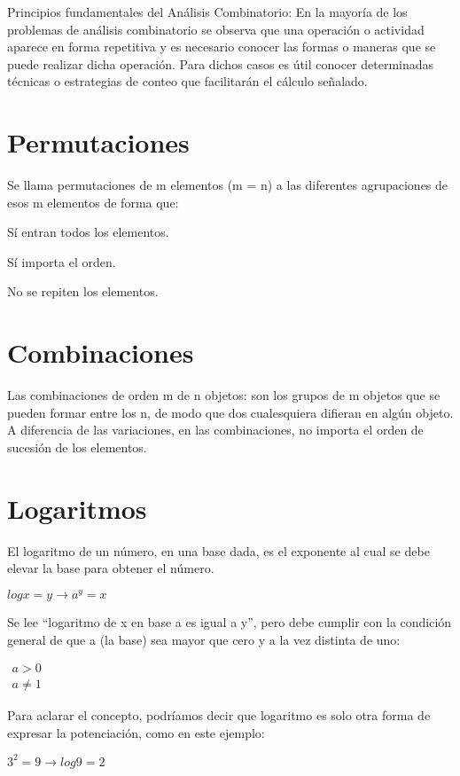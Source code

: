 \documentclass{article}
\begin{document}
Principios fundamentales del An\'alisis Combinatorio: En la mayor\'ia de los problemas de an\'alisis combinatorio se observa que una operaci\'on o actividad aparece en forma repetitiva y es necesario conocer las formas o maneras que se puede realizar dicha operaci\'on. Para dichos casos es \'util conocer determinadas t\'ecnicas o estrategias de conteo que facilitar\'an el c\'alculo se\~nalado.

\section[Permutaciones]{Permutaciones}
Se llama permutaciones de m elementos (m = n) a las diferentes agrupaciones de esos m elementos de forma que:

S\'i entran todos los elementos.

S\'i importa el orden.

No se repiten los elementos. \ 

\section[Combinaciones]{Combinaciones}
Las combinaciones de orden m de n objetos: son los grupos de m objetos que se pueden formar entre los n, de modo que dos cualesquiera difieran en alg\'un objeto. A diferencia de las variaciones, en las combinaciones, no importa el orden de sucesi\'on de los elementos.

\section[Logaritmos]{Logaritmos}
El logaritmo de un n\'umero, en una base dada, es el exponente al cual se debe elevar la base para obtener el n\'umero.

 $logx=y\rightarrow a^{y}=x$

Se lee {\textquotedblleft}logaritmo de x en base a es igual a y{\textquotedblright}, pero debe cumplir con la condici\'on general de que a (la base) sea mayor que cero y a la vez distinta de uno:

 $\begin{matrix}a>0\\a\neq 1\end{matrix}$

Para aclarar el concepto, podr\'iamos decir que logaritmo es solo otra forma de expresar la potenciaci\'on, como en este ejemplo:

 $3^{2}=9\rightarrow log9=2$
\end{document}
